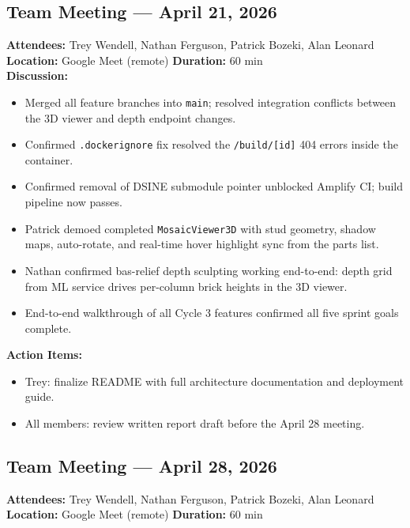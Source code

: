 \documentclass[12pt]{article}
\begin{document}
\vspace{1em}
\subsection{Team Meeting --- April 21, 2026}

\textbf{Attendees:} Trey Wendell, Nathan Ferguson, Patrick Bozeki, Alan Leonard\\
\textbf{Location:} Google Meet (remote) \quad \textbf{Duration:} 60 min\\[0.5em]

\textbf{Discussion:}
\begin{itemize}[leftmargin=*]
    \item Merged all feature branches into \texttt{main}; resolved integration conflicts between the 3D viewer and depth endpoint changes.
    \item Confirmed \texttt{.dockerignore} fix resolved the \texttt{/build/[id]} 404 errors inside the container.
    \item Confirmed removal of DSINE submodule pointer unblocked Amplify CI; build pipeline now passes.
    \item Patrick demoed completed \texttt{MosaicViewer3D} with stud geometry, shadow maps, auto-rotate, and real-time hover highlight sync from the parts list.
    \item Nathan confirmed bas-relief depth sculpting working end-to-end: depth grid from ML service drives per-column brick heights in the 3D viewer.
    \item End-to-end walkthrough of all Cycle 3 features confirmed all five sprint goals complete.
\end{itemize}

\textbf{Action Items:}
\begin{itemize}[leftmargin=*]
    \item Trey: finalize README with full architecture documentation and deployment guide.
    \item All members: review written report draft before the April 28 meeting.
\end{itemize}

\vspace{1em}
\subsection{Team Meeting --- April 28, 2026}

\textbf{Attendees:} Trey Wendell, Nathan Ferguson, Patrick Bozeki, Alan Leonard\\
\textbf{Location:} Google Meet (remote) \quad \textbf{Duration:} 60 min\\[0.5em]
\end{document}
